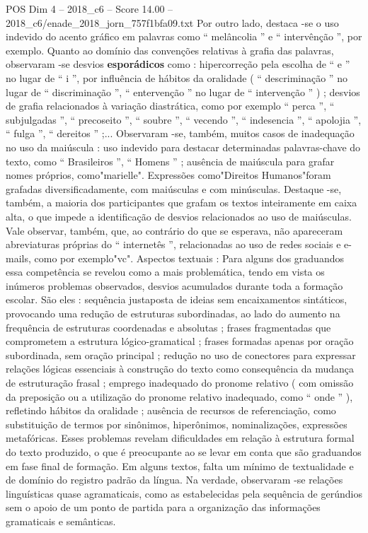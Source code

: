 \begin{textsample}{POS Dim 4 – 2018\_c6 – Score 14.00 – 2018\_c6/enade\_2018\_jorn\_757f1bfa09.txt}
Por outro lado, destaca -se o uso indevido do acento gráfico em palavras como “ melâncolia ” e “ intervênção ”, por exemplo.
Quanto ao domínio das convenções relativas à grafia das palavras, observaram -se desvios \textbf{esporádicos} como : hipercorreção pela escolha de “ e ” no lugar de “ i ”, por influência de hábitos da oralidade ( “ descriminação ” no lugar de “ discriminação ”, “ entervenção ” no lugar de “ intervenção ” ) ; desvios de grafia relacionados à variação diastrática, como por exemplo “ perca ”, “ subjulgadas ”, “ precoseito ”, “ soubre ”, “ vecendo ”, “ indesencia ”, “ apolojia ”, “ fulga ”, “ dereitos ” ;...
Observaram -se, também, muitos casos de inadequação no uso da maiúscula : uso indevido para destacar determinadas palavras-chave do texto, como “ Brasileiros ”, “ Homens ” ; ausência de maiúscula para grafar nomes próprios, como"marielle".
Expressões como"Direitos Humanos"foram grafadas diversificadamente, com maiúsculas e com minúsculas.
Destaque -se, também, a maioria dos participantes que grafam os textos inteiramente em caixa alta, o que impede a identificação de desvios relacionados ao uso de maiúsculas.
Vale observar, também, que, ao contrário do que se esperava, não apareceram abreviaturas próprias do “ internetês ”, relacionadas ao uso de redes sociais e e-mails, como por exemplo"vc".
Aspectos textuais : Para alguns dos graduandos essa competência se revelou como a mais problemática, tendo em vista os inúmeros problemas observados, desvios acumulados durante toda a formação escolar.
São eles : sequência justaposta de ideias sem encaixamentos sintáticos, provocando uma redução de estruturas subordinadas, ao lado do aumento na frequência de estruturas coordenadas e absolutas ; frases fragmentadas que comprometem a estrutura lógico-gramatical ; frases formadas apenas por oração subordinada, sem oração principal ; redução no uso de conectores para expressar relações lógicas essenciais à construção do texto como consequência da mudança de estruturação frasal ; emprego inadequado do pronome relativo ( com omissão da preposição ou a utilização do pronome relativo inadequado, como “ onde ” ), refletindo hábitos da oralidade ; ausência de recursos de referenciação, como substituição de termos por sinônimos, hiperônimos, nominalizações, expressões metafóricas.
Esses problemas revelam dificuldades em relação à estrutura formal do texto produzido, o que é preocupante ao se levar em conta que são graduandos em fase final de formação.
Em alguns textos, falta um mínimo de textualidade e de domínio do registro padrão da língua.
Na verdade, observaram -se relações linguísticas quase agramaticais, como as estabelecidas pela sequência de gerúndios sem o apoio de um ponto de partida para a organização das informações gramaticais e semânticas.

\end{textsample}
